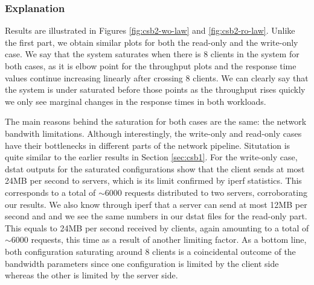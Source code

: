 \documentclass[11pt,a4paper]{article}
\begin{document}
\subsubsection{Explanation} \label{sec:csb2-exp}
Results are illustrated in Figures \ref{fig:csb2-wo-law} and \ref{fig:csb2-ro-law}. Unlike the first part, we obtain similar plots for both the read-only and the write-only case. We say that the system saturates when there is 8 clients in the system for both cases, as it is elbow point for the throughput plots and the response time values continue increasing linearly after crossing 8 clients. We can clearly say that the system is under saturated before those points as the throughput rises quickly we only see marginal changes in the response times in both workloads.
\par The main reasons behind the saturation for both cases are the same: the network bandwith limitations. Although interestingly, the write-only and read-only cases have their bottlenecks in different parts of the network pipeline. Situtation is quite similar to the earlier results in Section \ref{sec:csb1}. For the write-only case, dstat outputs for the saturated configurations show that the client sends at most 24MB per second to servers, which is its limit confirmed by iperf statistics. This corresponds to a total of $\sim 6000$ requests distributed to two servers, corroborating our results. We also know through iperf that a server can send at most 12MB per second and and we see the same numbers in our dstat files for the read-only part. This equals to 24MB per second received by clients, again amounting to a total of $\sim 6000$ requests, this time as a result of another limiting factor. As a bottom line, both configuration saturating around 8 clients is a coincidental outcome of the bandwidth parameters since one configuration is limited by the client side whereas the other is limited by the server side.
\end{document}
